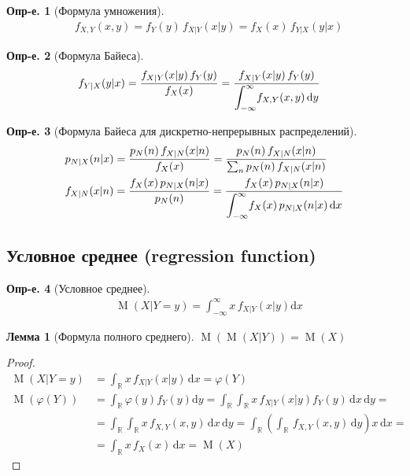 \documentclass[a4paper,12pt,fleqn]{article}
\newenvironment{onsamepage} {\begin{minipage}{\textwidth}} {\end{minipage}}
\numberwithin{figure}{section}
\theoremstyle{definition}
\newtheorem{definition}{Опр-е.}[section]
\newtheorem{lemma}{Лемма}[section]
\let\phi\varphi
\def\R{\mathbb{R}}
\def\d{\mathrm{d}}
\DeclareMathOperator{\M}{M}
\begin{document}
\begin{definition}[Формула умножения]
\begin{align*}
&	f_{X,Y}(x,y) = f_Y(y) \, f_{X|Y}(x|y) = f_X(x) \, f_{Y|X}(y|x)
\end{align*}
\end{definition}


\begin{definition}[Формула Байеса]
\begin{align*}
&	f_{Y|X}(y|x)
	= \frac{ f_{X|Y}(x|y) \, f_Y(y) }{ f_X(x) }
	= \frac{ f_{X|Y}(x|y) \, f_Y(y) }
			{ \mathlarger\int_{-\infty}^{\infty} f_{X,Y}(x,y) \, \d y }
\end{align*}
\end{definition}

\begin{definition}[Формула Байеса для дискретно-непрерывных распределений]
\begin{align*}
&	p_{N|X}(n|x)
	= \frac{ p_N(n) \, f_{X|N}(x|n) }{ f_X(x) }
	= \frac{ p_N(n) \, f_{X|N}(x|n) }{ \sum_n p_N(n) \, f_{X|N}(x|n) }
	\\
&	f_{X|N}(x|n)
	= \frac{ f_X(x) \, p_{N|X}(n|x) }{ p_N(n) }
	= \frac{ f_X(x) \, p_{N|X}(n|x) }
		{ \mathlarger\int_{-\infty}^{\infty} f_X(x) \, p_{N|X}(n|x) \, \d x }
\end{align*}
\end{definition}



\subsection{Условное среднее (regression function)}

\begin{definition}[Условное среднее]
\begin{align*}
&	\M(X|Y=y) = \int_{-\infty}^{\infty} x \, f_{X|Y}(x|y) \d x
\end{align*}
\end{definition}

\begin{onsamepage}
\begin{lemma}[Формула полного среднего]
	$\M \left( \M(X|Y) \right) = \M(X)$
\end{lemma}
\begin{proof}
\begin{align*}
	\M(X|Y=y) &= \int_\R x \, f_{X|Y}(x|y) \, \d x	= \phi(Y)	\\
	\M\left(\phi(Y)\right) &= \int_\R \phi(y) f_Y(y) \d y
	 = \int_\R \int_\R x \, f_{X|Y}(x|y) f_Y(y) \, \d x \, \d y	= \\
	&= \int_\R \int_\R x \, f_{X,Y}(x,y) \, \d x \, \d y
	 = \int_\R \left( \int_\R \, f_{X,Y}(x,y) \, \d y \right) x \, \d x = \\
	&= \int_\R x \, f_X(x) \, \d x
	 = \M(X)
\end{align*}
\end{proof}
\end{onsamepage}
\end{document}
